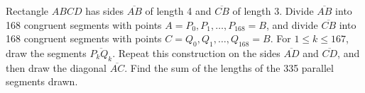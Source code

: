 Rectangle $ABCD$ has sides $\overline {AB}$ of length 4 and $\overline {CB}$ of length 3. Divide $\overline {AB}$ into 168 congruent segments with points $A=P_0, P_1, \ldots, P_{168}=B$, and divide $\overline {CB}$ into 168 congruent segments with points $C=Q_0, Q_1, \ldots, Q_{168}=B$. For $1 \le k \le 167$, draw the segments $\overline {P_kQ_k}$. Repeat this construction on the sides $\overline {AD}$ and $\overline {CD}$, and then draw the diagonal $\overline {AC}$. Find the sum of the lengths of the 335 parallel segments drawn.